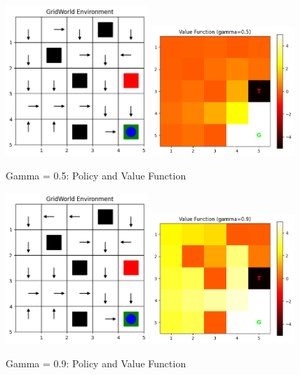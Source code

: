 \documentclass[12pt]{article}
\begin{document}
\begin{figure}[htbp]
  \centering
  \includegraphics[width=0.48\textwidth]{images/part1_q2_gamma_0.5_policy.png}
  \includegraphics[width=0.48\textwidth]{images/part1_q2_gamma_0.5_value.png}
  \caption{Gamma = 0.5: Policy and Value Function}
\end{figure}

\begin{figure}[htbp]
  \centering
  \includegraphics[width=0.48\textwidth]{images/part1_q2_gamma_0.9_policy.png}
  \includegraphics[width=0.48\textwidth]{images/part1_q2_gamma_0.9_value.png}
  \caption{Gamma = 0.9: Policy and Value Function}
\end{figure}
\end{document}
